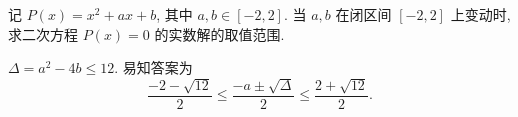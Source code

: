 \begin{prob}
\label{prob:prob-2}
记 $P(x) = x^2 + ax + b$, 其中 $a,b \in [-2,2]$.
当 $a,b$ 在闭区间 $[-2,2]$ 上变动时,
求二次方程 $P(x) = 0$ 的实数解的取值范围.
\end{prob}

\begin{soln}
$\Delta = a^2 - 4b \le 12$. 易知答案为
\[
\boxed{\frac{-2 - \sqrt{12}}{2}} \le
\frac{-a \pm \sqrt{\Delta}}{2} \le
\boxed{\frac{2 + \sqrt{12}}{2}.}
\]
\end{soln}

